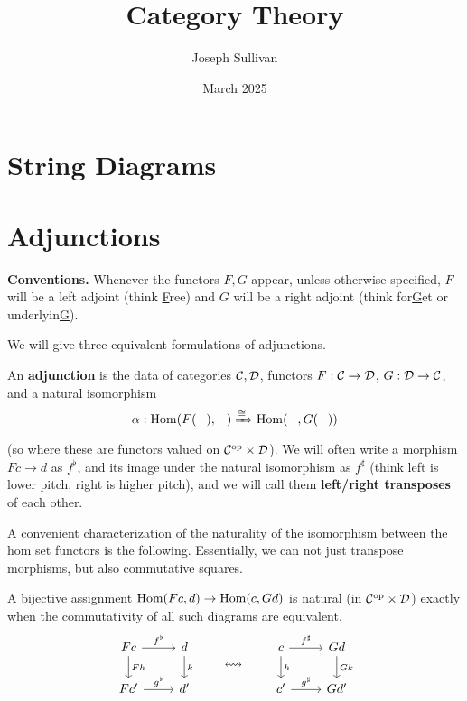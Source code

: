 \documentclass[12pt]{article}
\title{Category Theory}
\author{Joseph Sullivan}
\date{March 2025}
\begin{document}
\maketitle

\section{String Diagrams}

\section{Adjunctions}

\textbf{Conventions.} Whenever the functors $F,G$ appear, unless otherwise specified, $F$ will be a left adjoint (think \underline{F}ree) and $G$ will be a right adjoint (think for\underline{G}et or underlyin\underline{G}).

We will give three equivalent formulations of adjunctions.

\begin{defn}
    An \textbf{adjunction} is the data of categories $\mathcal{C},\mathcal{D}$, functors $F:\mathcal{C}\to \mathcal{D}$, $G:\mathcal{D}\to \mathcal{C}$, and a natural isomorphism
    \[\alpha: \mathrm{Hom}(F(-),-) \xRightarrow{\cong} \mathrm{Hom}(-,G(-))\]
    (so where these are functors valued on $\mathcal{C}^{\mathrm{op}} \times \mathcal{D}$).
    We will often write a morphism $Fc \to d$ as $f^\flat$, and its image under the natural isomorphism as $f^\sharp$ (think left is lower pitch, right is higher pitch), and we will call them \textbf{left/right transposes} of each other.
\end{defn}

A convenient characterization of the naturality of the isomorphism between the hom set functors is the following. Essentially, we can not just transpose morphisms, but also commutative squares.
\begin{prop}
    A bijective assignment $\mathrm{Hom}(Fc,d) \to \mathrm{Hom}(c,Gd)$ is natural (in $\mathcal{C}^{\mathrm{op}} \times \mathcal{D}$) exactly when the commutativity of all such diagrams are equivalent.
    \[\begin{tikzcd}
        Fc \rar["f^\flat"] \dar["Fh"] & d \dar["k"]\\
        Fc' \rar["g^\flat"] & d'
    \end{tikzcd} \qquad \leftrightsquigarrow\qquad
    \begin{tikzcd}
        c \rar["f^\sharp"] \dar["h"] & Gd \dar["Gk"]\\
        c' \rar["g^\sharp"] & Gd'
    \end{tikzcd}\]
\end{prop}
\end{document}
